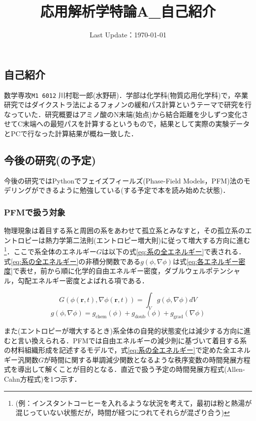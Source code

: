 \documentclass[dvipdfmx]{jsreport}
\title{応用解析学特論A_自己紹介}
\date{Last Update：\today}
\begin{document}

\subsection*{自己紹介}
	数学専攻\texttt{M1 6012} 川村聡一郎(水野研)．学部は化学科(物質応用化学科)で，卒業研究では{ダイクストラ法によるフォノンの緩和パス計算}というテーマで研究を行なっていた．研究概要はアミノ酸のN末端(始点)から結合距離を少しずつ変化させてC末端への最短パスを計算するというもので，結果として実際の実験データとPCで行なった計算結果が概ね一致した．

\subsection*{今後の研究(の予定)}
	今後の研究ではPythonでフェイズフィールズ(Phase-Field Models，PFM)法のモデリングができるように勉強している(する予定で本を読み始めた状態)．

\subsubsection*{PFMで扱う対象}
	物理現象は着目する系と周囲の系をあわせて孤立系とみなすと，その孤立系のエントロピーは熱力学第二法則(エントロピー増大則)に従って増大する方向に進む\footnote{(例：インスタントコーヒーを入れるような状況を考えて，最初は粉と熱湯が混じっていない状態だが，時間が経つにつれてそれらが混ざり合う)}．ここで系全体のエネルギー$G$は以下の式\eqref{eq:系の全エネルギー}で表される．式\eqref{eq:系の全エネルギー}の非積分関数である$g(\phi, \nabla\phi)$は式\eqref{eq:各エネルギー密度}で表せ，前から順に化学的自由エネルギー密度，ダブルウェルポテンシャル，勾配エネルギー密度とよばれる項である．

\begin{equation} \label{eq:系の全エネルギー}
	G(\phi(\bm{r}, t), \nabla\phi(\bm{r}, t))= \int_V g(\phi, \nabla\phi)dV
\end{equation}
\begin{equation}	\label{eq:各エネルギー密度}
	g(\phi, \nabla\phi)= g_\mathrm{chem}(\phi)+ g_\mathrm{doub}(\phi)+ g_\mathrm{grad}(\nabla\phi)
\end{equation}

	また(エントロピーが増大するとき)系全体の自発的状態変化は減少する方向に進むと言い換えられる．PFMでは自由エネルギーの減少則に基づいて着目する系の材料組織形成を記述するモデルで，式\eqref{eq:系の全エネルギー}で定めた全エネルギー汎関数$G$が時間に関する単調減少関数となるような秩序変数の時間発展方程式を導出して解くことが目的となる．直近で扱う予定の時間発展方程式(Allen- Cahn方程式)を1つ示す．
\end{document}
